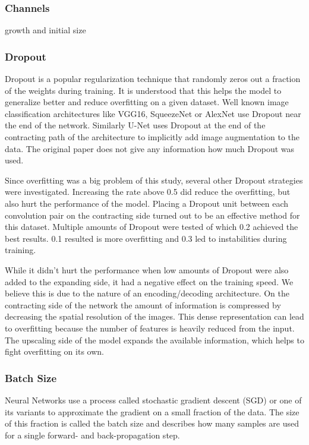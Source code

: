 \subsubsection{Channels}

growth and initial size

\subsubsection{Dropout}

Dropout is a popular regularization technique that randomly zeros out a fraction of the weights during training. It is understood that this helps the model to generalize better and reduce overfitting on a given dataset. Well known image classification architectures like VGG16, SqueezeNet or AlexNet use Dropout near the end of the network. Similarly U-Net uses Dropout at the end of the contracting path of the architecture to implicitly add image augmentation to the data. The original paper does not give any information how much Dropout was used.

Since overfitting was a big problem of this study, several other Dropout strategies were investigated. Increasing the rate above 0.5 did reduce the overfitting, but also hurt the performance of the model. Placing a Dropout unit between each convolution pair on the contracting side turned out to be an effective method for this dataset. Multiple amounts of Dropout were tested of which 0.2 achieved the best results. 0.1 resulted is more overfitting and 0.3 led to instabilities during training.

While it didn't hurt the performance when low amounts of Dropout were also added to the expanding side, it had a negative effect on the training speed. We believe this is due to the nature of an encoding/decoding architecture. On the contracting side of the network the amount of information is compressed by decreasing the spatial resolution of the images. This dense representation can lead to overfitting because the number of features is heavily reduced from the input. The upscaling side of the model expands the available information, which helps to fight overfitting on its own.


\subsubsection{Batch Size}

Neural Networks use a process called stochastic gradient descent (SGD) or one of its variants to approximate the gradient on a small fraction of the data. The size of this fraction is called the batch size and describes how many samples are used for a single forward- and back-propagation step.

